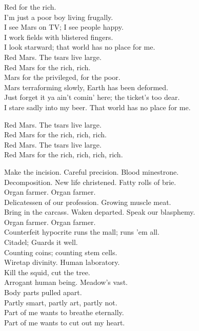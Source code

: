 Red  for the rich.\\

I'm just a poor boy living frugally.\\
I see Mars on TV; I see people happy. \\
I work fields with blistered fingers. \\
I look starward; that world has no place for me. \\

Red Mars. The tsars live large. \\
Red Mars for the rich, rich. \\

Mars for the privileged,  for the poor. \\
Mars terraforming slowly, Earth has been deformed. \\
Just forget it ya ain't comin' here; the ticket's too dear. \\
I stare sadly into my beer. That world has no place for me.

Red Mars. The tsars live large. \\
Red Mars for the rich, rich, rich. \\
Red Mars. The tsars live large. \\
Red Mars for the rich, rich, rich, rich. \\




Make the incision. Careful precision. Blood minestrone. \\
Decomposition. New life christened. Fatty rolls of brie. \\

Organ farmer. Organ farmer. \\

Delicatessen of our profession. Growing muscle meat. \\
Bring in the carcass. Waken departed. Speak our blasphemy. \\

Organ farmer. Organ farmer. \\

Counterfeit hypocrite runs the mall; runs 'em all. \\
Citadel; Guards it well. \\
Counting coins; counting stem cells. \\
Wiretap divinity. Human laboratory. \\
Kill the squid, cut the tree. \\
Arrogant human being. Meadow's vast. \\
Body parts pulled apart. \\
Partly smart, partly art, partly not. \\
Part of me wants to breathe eternally. \\
Part of me wants to cut out my heart. \\

